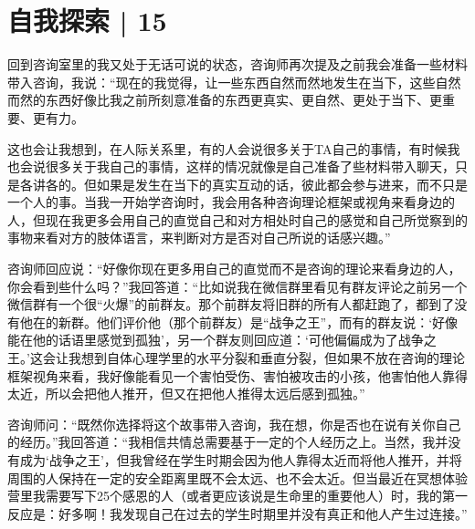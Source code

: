 \chapter{自我探索 | 15}



回到咨询室里的我又处于无话可说的状态，咨询师再次提及之前我会准备一些材料带入咨询，我说：“现在的我觉得，让一些东西自然而然地发生在当下，这些自然而然的东西好像比我之前所刻意准备的东西更真实、更自然、更处于当下、更重要、更有力。

这也会让我想到，在人际关系里，有的人会说很多关于TA自己的事情，有时候我也会说很多关于我自己的事情，这样的情况就像是自己准备了些材料带入聊天，只是各讲各的。但如果是发生在当下的真实互动的话，彼此都会参与进来，而不只是一个人的事。当我一开始学咨询时，我会用各种咨询理论框架或视角来看身边的人，但现在我更多会用自己的直觉\pozhehao{}自己和对方相处时自己的感觉和自己所觉察到的事物\pozhehao{}来看对方的肢体语言，来判断对方是否对自己所说的话感兴趣。”

咨询师回应说：“好像你现在更多用自己的直觉而不是咨询的理论来看身边的人，你会看到些什么吗？”我回答道：“比如说我在微信群里看见有群友评论之前另一个微信群有一个很“火爆”的前群友。那个前群友将旧群的所有人都赶跑了，都到了没有他在的新群。他们评价他（那个前群友）是“战争之王”，而有的群友说：‘好像能在他的话语里感觉到孤独’，另一个群友则回应道：‘可他偏偏成为了战争之王。’这会让我想到自体心理学里的水平分裂和垂直分裂，但如果不放在咨询的理论框架视角来看，我好像能看见一个害怕受伤、害怕被攻击的小孩，他害怕他人靠得太近，所以会把他人推开，但又在把他人推得太远后感到孤独。”

咨询师问：“既然你选择将这个故事带入咨询，我在想，你是否也在说有关你自己的经历。”我回答道：“我相信共情总需要基于一定的个人经历之上。当然，我并没有成为‘战争之王’，但我曾经在学生时期会因为他人靠得太近而将他人推开，并将周围的人保持在一定的安全距离里\pozhehao{}既不会太远、也不会太近。但当最近在冥想体验营里我需要写下25个感恩的人（或者更应该说是生命里的重要他人）时，我的第一反应是：好多啊！我发现自己在过去的学生时期里并没有真正和他人产生过连接。”

\tristarsepline

